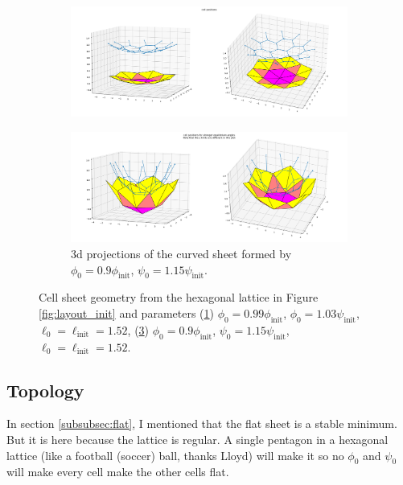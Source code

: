 \begin{figure}[htbp]
    \centering
    \begin{subfigure}[b]{\textwidth}
        \centering 
        \includegraphics[width=\textwidth]{shallow.png}
        \caption{}
        \label{subfig:shallow}
    \end{subfigure}
    \begin{subfigure}[b]{\textwidth}
        \centering
        \includegraphics[width=\textwidth]{deep.png}
        \caption{3d projections of the curved sheet formed by $\phi_0 = 0.9 \phi_{\text{init}}$, $\psi_0 = 1.15\psi_{\text{init}}$. }
        \label{subfig:deep}
    \end{subfigure}
    \caption{Cell sheet geometry from the hexagonal lattice in Figure \ref{fig:layout_init} and parameters (\ref{subfig:shallow}) $\phi_0 = 0.99 \phi_{\text{init}}$, $\phi_0 = 1.03 \psi_{\text{init}}$, $\ell_0 = \ell_{\text{init}}=1.52$, (\ref{subfig:deep}) $\phi_0 = 0.9 \phi_{\text{init}}$, $\psi_0 = 1.15\psi_{\text{init}}$, $\ell_0 = \ell_{\text{init}}=1.52$. }
\end{figure}

\subsection{Topology}

In section \ref{subsubsec:flat}, I mentioned that the flat sheet is a stable minimum. But it is here because the lattice is regular. A single pentagon in a hexagonal lattice (like a football (soccer) ball, thanks Lloyd) will make it so no $\phi_0$ and $\psi_0$ will make every cell make the other cells flat. 

